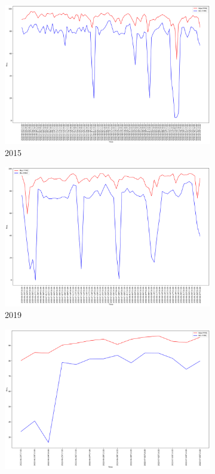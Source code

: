 \begin{figure}[h]
	\centering
	\caption{Daily max and min FFMC values}
	\begin{subfigure}{0.45\textwidth}
		\centering
		\includegraphics[width=\textwidth]{graphs/2015/byHour/FFMC_maxMin.png}
		\caption{2015}
	\end{subfigure}
	\hfill
	\begin{subfigure}{0.45\textwidth}
		\centering
		\includegraphics[width=\textwidth]{graphs/2019/byHour/FFMC_maxMin.png}
		\caption{2019}
	\end{subfigure}
	\hfill
	\begin{subfigure}{0.45\textwidth}
		\centering
		\includegraphics[width=\textwidth]{graphs/2022/FFMC_maxMin.png}

\end{subfigure}
\end{figure}
